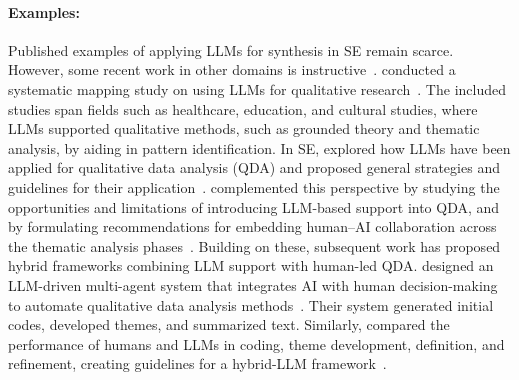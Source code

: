 \documentclass[smallextended]{svjour3}
\newcommand{\studytypeparagraph}[1]{\paragraph{\bfseries #1:}}
\newcommand{\studytypeparagraph}[1]{\subsubsection{#1}}
\begin{document}
\studytypeparagraph{Examples} 

Published examples of applying LLMs for synthesis in SE remain scarce. However, some recent work in other domains is instructive~\cite{DBLP:journals/ase/BanoHZT24}.
\citeauthor{DBLP:conf/wsese/BarrosANKKNB25} conducted a systematic mapping study on using LLMs for qualitative research~\cite{DBLP:conf/wsese/BarrosANKKNB25}. The included studies span fields such as healthcare, education, and cultural studies, where LLMs supported qualitative methods, such as grounded theory and thematic analysis, by aiding in pattern identification.
In SE, \citeauthor{DBLP:conf/wsese/LecaVSS25} explored how LLMs have been applied for qualitative data analysis (QDA) and proposed general strategies and guidelines for their application~\cite{DBLP:conf/wsese/LecaVSS25}. \citeauthor{DBLP:journals/corr/abs-2511-14528} complemented this perspective by studying the opportunities and limitations of introducing LLM-based support into QDA, and by formulating recommendations for embedding human–AI collaboration across the thematic analysis phases~\cite{DBLP:journals/corr/abs-2511-14528}. Building on these, subsequent work has proposed hybrid frameworks combining LLM support with human-led QDA. \citeauthor{DBLP:journals/corr/abs-2402-01386} designed an LLM-driven multi-agent system that integrates AI with human decision-making to automate qualitative data analysis methods~\cite{DBLP:journals/corr/abs-2402-01386}. Their system generated initial codes, developed themes, and summarized text. Similarly, \citeauthor{DBLP:journals/corr/abs-2510-18456} compared the performance of humans and LLMs in coding, theme development, definition, and refinement, creating guidelines for a hybrid-LLM framework~\cite{DBLP:journals/corr/abs-2510-18456}.
\end{document}

